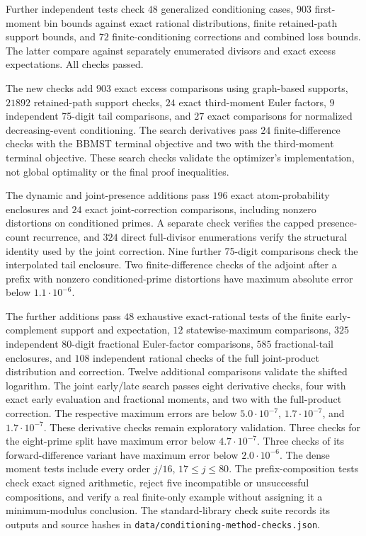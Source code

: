 \documentclass[11pt]{article}
\begin{document}
Further independent tests check $48$ generalized conditioning cases,
$903$ first-moment bin bounds against exact rational distributions,
finite retained-path support bounds, and $72$ finite-conditioning corrections
and combined loss bounds. The latter compare against separately enumerated
divisors and exact excess expectations. All checks passed.

The new checks add $903$ exact excess comparisons using graph-based supports,
$21892$ retained-path support checks, $24$ exact third-moment Euler factors,
$9$ independent 75-digit tail comparisons, and $27$ exact comparisons for
normalized decreasing-event conditioning. The search derivatives pass $24$
finite-difference checks with the BBMST terminal objective and two with the
third-moment terminal objective. These search checks validate the optimizer's
implementation, not global optimality or the final proof inequalities.

The dynamic and joint-presence additions pass $196$ exact atom-probability
enclosures and $24$ exact joint-correction comparisons, including nonzero
distortions on conditioned primes. A separate check verifies the capped
presence-count recurrence, and $324$ direct full-divisor enumerations verify
the structural identity used by the joint correction. Nine further 75-digit comparisons check the
interpolated tail enclosure. Two finite-difference checks of the adjoint
after a prefix with nonzero conditioned-prime distortions have maximum
absolute error below $1.1\cdot10^{-6}$.

The further additions pass $48$ exhaustive exact-rational tests of the
finite early-complement support and expectation, $12$ statewise-maximum
comparisons, $325$ independent 80-digit fractional Euler-factor comparisons,
$585$ fractional-tail enclosures, and $108$ independent rational checks of
the full joint-product distribution and correction. Twelve additional
comparisons validate the shifted logarithm. The joint early/late search
passes eight derivative checks, four with exact early evaluation and
fractional moments, and two with the full-product correction. The respective
maximum errors are below $5.0\cdot10^{-7}$, $1.7\cdot10^{-7}$, and
$1.7\cdot10^{-7}$. These derivative checks remain exploratory validation.
Three checks for the eight-prime split have maximum error below
$4.7\cdot10^{-7}$. Three checks of its forward-difference variant have
maximum error below $2.0\cdot10^{-6}$.
The dense moment tests include every order $j/16$, $17\leq j\leq80$.
The prefix-composition tests check exact signed arithmetic, reject five
incompatible or unsuccessful compositions, and verify a real finite-only
example without assigning it a minimum-modulus conclusion.
The standard-library check suite records its outputs and source hashes in
\texttt{data/conditioning-method-checks.json}.
\end{document}
